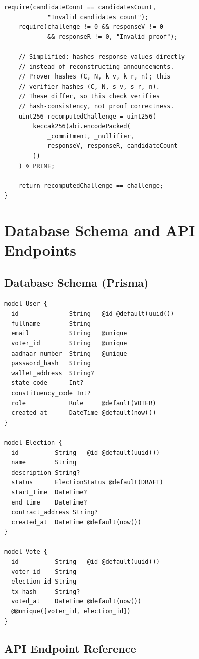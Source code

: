 \documentclass[oneside,a4paper,12pt]{book}
\begin{document}
\begin{appendices}
\begin{lstlisting}[language=Solidity, caption={ZKPVoting.sol --- ZKP Verification}]
    require(candidateCount == candidatesCount,
            "Invalid candidates count");
    require(challenge != 0 && responseV != 0
            && responseR != 0, "Invalid proof");

    // Simplified: hashes response values directly
    // instead of reconstructing announcements.
    // Prover hashes (C, N, k_v, k_r, n); this
    // verifier hashes (C, N, s_v, s_r, n).
    // These differ, so this check verifies
    // hash-consistency, not proof correctness.
    uint256 recomputedChallenge = uint256(
        keccak256(abi.encodePacked(
            _commitment, _nullifier,
            responseV, responseR, candidateCount
        ))
    ) % PRIME;

    return recomputedChallenge == challenge;
}
\end{lstlisting}

\chapter{Database Schema and API Endpoints}

\section{Database Schema (Prisma)}

\begin{lstlisting}[caption={schema.prisma --- Key Models}]
model User {
  id              String   @id @default(uuid())
  fullname        String
  email           String   @unique
  voter_id        String   @unique
  aadhaar_number  String   @unique
  password_hash   String
  wallet_address  String?
  state_code      Int?
  constituency_code Int?
  role            Role     @default(VOTER)
  created_at      DateTime @default(now())
}

model Election {
  id          String   @id @default(uuid())
  name        String
  description String?
  status      ElectionStatus @default(DRAFT)
  start_time  DateTime?
  end_time    DateTime?
  contract_address String?
  created_at  DateTime @default(now())
}

model Vote {
  id          String   @id @default(uuid())
  voter_id    String
  election_id String
  tx_hash     String?
  voted_at    DateTime @default(now())
  @@unique([voter_id, election_id])
}
\end{lstlisting}

\section{API Endpoint Reference}


\end{appendices}
\end{document}

